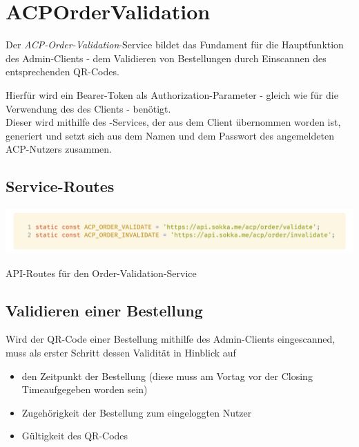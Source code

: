 \section{ACPOrderValidation}

Der \textit{ACP-Order-Validation}-Service bildet das Fundament für die Hauptfunktion des Admin-Clients -
dem Validieren von Bestellungen durch Einscannen des entsprechenden QR-Codes.

Hierfür wird ein Bearer-Token als Authorization-Parameter - gleich wie für die Verwendung des 
 des Clients - benötigt.\\
Dieser wird mithilfe des -Services, der aus dem Client übernommen worden ist,
generiert und setzt sich aus dem Namen und dem Passwort des angemeldeten ACP-Nutzers zusammen.

\subsection{Service-Routes}

\begin{code}[H]
    \centering
    \includegraphics[width=1\textwidth]{images/Admin-Client/services/acpordervalidation/routes.png}
    \vspace{-25pt}
    \caption{API-Routes für den Order-Validation-Service}
\end{code}

\subsection{Validieren einer Bestellung}

Wird der QR-Code einer Bestellung mithilfe des Admin-Clients eingescanned, muss als erster Schritt dessen
Validität in Hinblick auf 

\begin{itemize}
    \item den Zeitpunkt der Bestellung (diese muss am Vortag vor der \glqq Closing Time\grqq aufgegeben worden sein)
    \item Zugehörigkeit der Bestellung zum eingeloggten Nutzer
    \item Gültigkeit des QR-Codes
\end{itemize}

